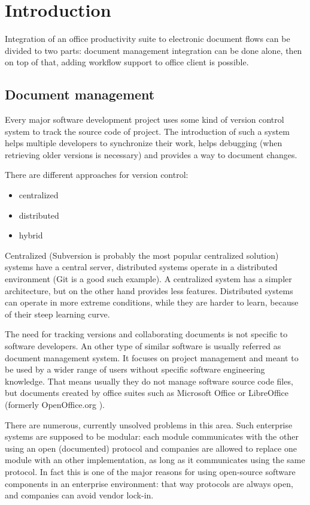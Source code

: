 \chapter{Introduction}

Integration of an office productivity suite to electronic document flows can be
divided to two parts: document management integration can be done alone, then
on top of that, adding workflow support to office client is possible.

\section{Document management}

Every major software development project uses some kind of version control
system to track the source code of project. The introduction of such a system
helps multiple developers to synchronize their work, helps debugging (when
retrieving older versions is necessary) and provides a way to document changes.

There are different approaches for version control:

\begin{itemize}
\item centralized
\item distributed
\item hybrid
\end{itemize}

Centralized (Subversion \cite{subversion} is probably the most
popular centralized solution) systems have a central server, distributed
systems operate in a distributed environment (Git \cite{git} is a good such
example). A centralized system has a simpler architecture, but on the other
hand provides less features. Distributed systems can operate in more extreme
conditions, while they are harder to learn, because of their steep learning
curve.

The need for tracking versions and collaborating documents is not specific to
software developers. An other type of similar software is usually referred as
document management system. It focuses on project management and meant to be
used by a wider range of users without specific software engineering knowledge.
That means usually they do not manage software source code files, but documents
created by office suites such as Microsoft Office \cite{mso} or
LibreOffice \cite{lo} (formerly OpenOffice.org \cite{ooo}).

There are numerous, currently unsolved problems in this area. Such enterprise
systems are supposed to be modular: each module communicates with the other
using an open (documented) protocol and companies are allowed to replace one
module with an other implementation, as long as it communicates using the same
protocol. In fact this is one of the major reasons for using open-source
software components in an enterprise environment: that way protocols are always
open, and companies can avoid vendor lock-in.

